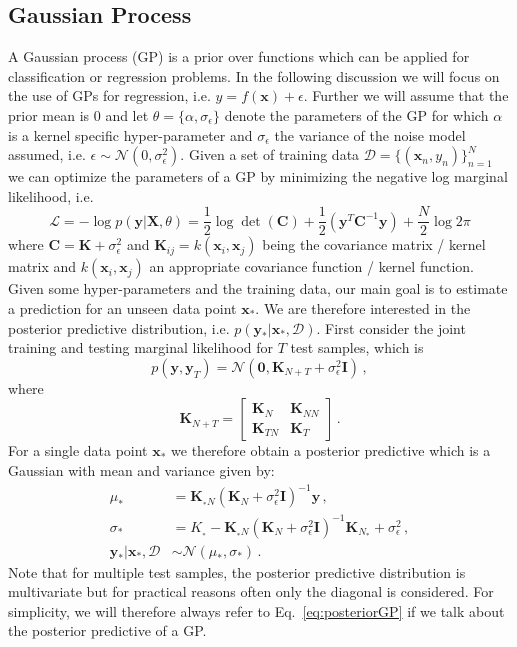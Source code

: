 \documentclass[10pt,letterpaper]{article}
\newcommand\N{\ensuremath{\mathcal{N}}}
\newcommand{\X}{\mathbf{X}}
\newcommand{\C}{\mathbf{C}}
\newcommand{\loss}{\mathcal{L}}
\newcommand{\K}{\mathbf{K}}
\newcommand{\data}{\mathcal{D}}
\newcommand{\x}{\mathbf{x}}
\newcommand{\y}{\mathbf{y}}
\newcommand{\xn}{\mathbf{x}_{n}}
\newcommand{\new}{_{*}}
\theoremstyle{mystyle}
\begin{document}
\subsection{Gaussian Process} \label{sec:gps}
A Gaussian process (GP) is a prior over functions which can be applied for classification or regression problems.
In the following discussion we will focus on the use of GPs for regression, i.e. $y = f(\x) + \epsilon$.
Further we will assume that the prior mean is $0$ and let $\theta = \{\alpha, \sigma_{\epsilon}\}$ denote the parameters of the GP for which $\alpha$ is a kernel specific hyper-parameter and $\sigma_{\epsilon}$ the variance of the noise model assumed, i.e. $\epsilon \sim \N(0, \sigma_{\epsilon}^2)$.
Given a set of training data $\data = \{(\xn, y_n)\}_{n=1}^{N}$ we can optimize the parameters of a GP by minimizing the negative log marginal likelihood, i.e.
\begin{equation}
  \loss = - \log p(\y | \X, \theta) = \frac{1}{2} \log \det(\C) + \frac{1}{2}(\y^T \C^{-1} \y) + \frac{N}{2} \log 2\pi
\end{equation}
where $\C = \K + \sigma^2_{\epsilon}$ and $\K_{ij} = k(\x_i, \x_j)$ being the covariance matrix / kernel matrix and $k(\x_i, \x_j)$ an appropriate covariance function / kernel function.
Given some hyper-parameters and the training data, our main goal is to estimate a prediction for an unseen data point $\x\new$. 
We are therefore interested in the posterior predictive distribution, i.e. $p(\y\new | \x\new, \data)$.
First consider the joint training and testing marginal likelihood for $T$ test samples, which is
\[
  p(\y, \y_T) = \N(\bm 0, \K_{N+T} + \sigma^2_{\epsilon}\bm I) \, ,
\]
where
\[
\K_{N+T} = \left[ \begin{array}{cc}
\K_{N} & \K_{NN} \\
\K_{TN} & \K_{T} \end{array} \right] \, .
\]
For a single data point $\x\new$ we therefore obtain a posterior predictive which is a Gaussian with mean and variance given by:
\begin{align}
  \mu\new &= \K_{\new N} (\K_N + \sigma^2_{\epsilon}\bm I)^{-1} \y \, ,\\
  \sigma\new &= K_{\new} - \K_{\new N}(\K_N + \sigma^2_{\epsilon}\bm I)^{-1} \K_{N \new} + \sigma^2_{\epsilon} \, ,\\
  \y\new | \x\new, \data &\sim \N(\mu\new, \sigma\new)\, . \label{eq:posteriorGP}
\end{align}
Note that for multiple test samples, the posterior predictive distribution is multivariate but for practical reasons often only the diagonal is considered.
For simplicity, we will therefore always refer to Eq.~\ref{eq:posteriorGP} if we talk about the posterior predictive of a GP.
\end{document}
